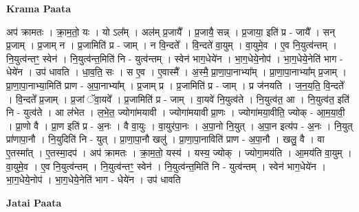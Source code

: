 \documentclass[17pt]{extarticle}
\begin{document}
\textbf{Krama Paata} \newline

अप॑ क्रामतः । क्रा॒म॒तो॒ यः । यो ऽल᳚म् । अल॑म् प्र॒जायै᳚ । प्र॒जायै॒ सन्न् । प्र॒जाया॒ इति॑ प्र - जायै᳚ । सन् प्र॒जाम् । प्र॒जाम् न । प्र॒जामिति॑ प्र - जाम् । न वि॒न्दते᳚ । वि॒न्दते॑ वा॒युम् । वा॒युमे॒व । ए॒व नि॒युत्व॑न्तम् । नि॒युत्व॑न्तꣳ॒॒ स्वेन॑ । नि॒युत्व॑न्त॒मिति॑ नि - युत्व॑न्तम् । स्वेन॑ भाग॒धेये॑न । भा॒ग॒धेये॒नोप॑ । भा॒ग॒धेये॒नेति॑ भाग - धेये॑न । उप॑ धावति । धा॒व॒ति॒ सः । स ए॒व । ए॒वास्मै᳚ । अ॒स्मै॒ प्रा॒णा॒पा॒नाभ्या᳚म् । प्रा॒णा॒पा॒नाभ्या᳚म् प्र॒जाम् । प्रा॒णा॒पा॒नाभ्या॒मिति॑ प्राण - अ॒पा॒नाभ्या᳚म् । प्र॒जाम् प्र । प्र॒जामिति॑ प्र - जाम् । प्र ज॑नयति । ज॒न॒य॒ति॒ वि॒न्दते᳚ । वि॒न्दते᳚ प्र॒जाम् । प्र॒जां ॅवा॒यवे᳚ । प्र॒जामिति॑ प्र - जाम् । वा॒यवे॑ नि॒युत्व॑ते । नि॒युत्व॑त॒ आ । नि॒युत्व॑त॒ इति॑ नि - युत्व॑ते । आ ल॑भेत । ल॒भे॒त॒ ज्योगा॑मयावी । ज्योगा॑मयावी प्रा॒णः । ज्योगा॑मया॒वीति॒ ज्योक् - आ॒म॒या॒वी॒ । प्रा॒णो वै । प्रा॒ण इति॑ प्र - अ॒नः । वै वा॒युः । वा॒युर॑पा॒नः । अ॒पा॒नो नि॒युत् । अ॒पा॒न इत्य॑प - अ॒नः । नि॒युत् प्रा॑णापा॒नौ । नि॒युदिति॑ नि - युत् । प्रा॒णा॒पा॒नौ खलु॑ । प्रा॒णा॒पा॒नाविति॑ प्राण - अ॒पा॒नौ । खलु॒ वै । वा ए॒तस्मा᳚त् । ए॒तस्मा॒दप॑ । अप॑ क्रामतः । क्रा॒म॒तो॒ यस्य॑ । यस्य॒ ज्योक् । ज्योगा॒मय॑ति । आ॒मय॑ति वा॒युम् । वा॒युमे॒व । ए॒व नि॒युत्व॑न्तम् । नि॒युत्व॑न्तꣳ॒॒ स्वेन॑ । नि॒युत्व॑न्त॒मिति॑ नि - युत्व॑न्तम् । स्वेन॑ भाग॒धेये॑न । भा॒ग॒धेये॒नोप॑ । भा॒ग॒धेये॒नेति॑ भाग - धेये॑न । उप॑ धावति \newline

\textbf{Jatai Paata} \newline
\end{document}
